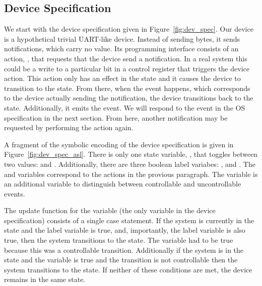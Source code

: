 \subsection{Device Specification}

We start with the device specification given in Figure~\ref{fig:dev_spec}. Our device is a hypothetical trivial UART-like device. Instead of sending bytes, it sends notifications, which carry no value. Its programming interface consists of an action, , that requests that the device send a notification. In a real system this could be a write to a particular bit in a control register that triggers the device action. This action only has an effect in the  state and it causes the device to transition to the  state. From there, when the  event happens, which corresponds to the device actually sending the notification, the device transitions back to the  state. Additionally, it emits the  event. We will respond to the  event in the OS specification in the next section. From here, another notification may be requested by performing the  action again.

A fragment of the symbolic encoding of the device specification is given in Figure~\ref{fig:dev_spec_asl}. There is only one state variable, , that toggles between two values:  and . Additionally, there are three boolean label variabes: ,  and . The  and  variables correspond to the actions in the provious paragraph. The  variable is an additional variable to distinguish between controllable and uncontrollable events. 

The update function for the  variable (the only variable in the device specification) consists of a single case statement. If the system is currently in the  state and the  label variable is true, and, importantly, the  label variable is also true, then the system transitions to the  state. The  variable had to be true because this was a controllable transition. Additionally if the system is in the  state and the  variable is true and the transition is not controllable then the system transitions to the  state. If neither of these conditions are met, the device remains in the same state. 

